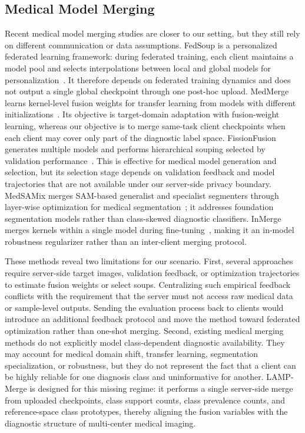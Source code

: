 \subsection{Medical Model Merging}

Recent medical model merging studies are closer to our setting, but they still rely on different communication or data assumptions. FedSoup is a personalized federated learning framework: during federated training, each client maintains a model pool and selects interpolations between local and global models for personalization~\cite{chen2023fedsoup}. It therefore depends on federated training dynamics and does not output a single global checkpoint through one post-hoc upload. MedMerge learns kernel-level fusion weights for transfer learning from models with different initializations~\cite{almakky2024medmerge}. Its objective is target-domain adaptation with fusion-weight learning, whereas our objective is to merge same-task client checkpoints when each client may cover only part of the diagnostic label space. FissionFusion generates multiple models and performs hierarchical souping selected by validation performance~\cite{sanjeev2024fissionfusion}. This is effective for medical model generation and selection, but its selection stage depends on validation feedback and model trajectories that are not available under our server-side privacy boundary. MedSAMix merges SAM-based generalist and specialist segmenters through layer-wise optimization for medical segmentation~\cite{yang2026medsamix}; it addresses foundation segmentation models rather than class-skewed diagnostic classifiers. InMerge merges kernels within a single model during fine-tuning~\cite{wang2025inmerge}, making it an in-model robustness regularizer rather than an inter-client merging protocol.

These methods reveal two limitations for our scenario. First, several approaches require server-side target images, validation feedback, or optimization trajectories to estimate fusion weights or select soups. Centralizing such empirical feedback conflicts with the requirement that the server must not access raw medical data or sample-level outputs. Sending the evaluation process back to clients would introduce an additional feedback protocol and move the method toward federated optimization rather than one-shot merging. Second, existing medical merging methods do not explicitly model class-dependent diagnostic availability. They may account for medical domain shift, transfer learning, segmentation specialization, or robustness, but they do not represent the fact that a client can be highly reliable for one diagnosis class and uninformative for another. LAMP-Merge is designed for this missing regime: it performs a single server-side merge from uploaded checkpoints, class support counts, class prevalence counts, and reference-space class prototypes, thereby aligning the fusion variables with the diagnostic structure of multi-center medical imaging.

